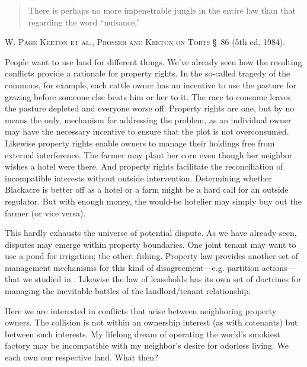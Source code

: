 \begin{quote}
There is perhaps no more impenetrable jungle in the entire law than that
regarding the word ``nuisance.''
\end{quote}
\textsc{W. Page Keeton et al.}, \textsc{Prosser and Keeton on Torts}
\S~86 (5th ed. 1984).


People want to use land for different things. We've already seen how the
resulting conflicts provide a rationale for property rights. In the so-called
tragedy of the commons, for example, each cattle owner has an incentive to use
the pasture for grazing before someone else beats him or her to it. The race to
consume leaves the pasture depleted and everyone worse off. Property rights are
one, but by no means the only, mechanism for addressing the problem, as an
individual owner may have the necessary incentive to ensure that the plot is not
overconsumed. Likewise property rights enable owners to manage their holdings
free from external interference. The farmer may plant her corn even though her
neighbor wishes a hotel were there. And property rights facilitate the
reconciliation of incompatible interests without outside intervention.
Determining whether Blackacre is better off as a hotel or a farm might be a hard
call for an outside regulator. But with enough money, the would-be hotelier may
simply buy out the farmer (or vice versa).



This hardly exhausts the universe of potential dispute. As we have already seen,
disputes may emerge within property boundaries. One joint tenant may want to use
a pond for irrigation; the other, fishing. Property law provides another set of
management mechanisms for this kind of disagreement---e.g. partition
actions---that we studied in . Likewise the law
of leaseholds has its own set of doctrines for managing the inevitable battles
of the landlord/tenant relationship.

Here we are interested in conflicts that arise between neighboring property
owners. The collision is not within an ownership interest (as with cotenants)
but between such interests. My lifelong dream of operating the world's smokiest
factory may be incompatible with my neighbor's desire for odorless living. We
each own our respective land. What then? 

